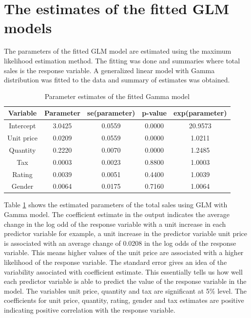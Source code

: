 \section{The estimates of the fitted GLM models}
The parameters of the fitted  GLM model are estimated using the maximum likelihood estimation method. The fitting was done and summaries where total sales is the response variable.
A generalized linear model with Gamma distribution was fitted to the data and summary of estimates was obtained. 
\begin{table}[H]
\centering
\caption{Parameter estimates of the fitted Gamma model}	
	\begin{tabular}{ccccc}
		\hline
		Variable   & Parameter & se(parameter) & p-value & exp(parameter) \\ \hline
		Intercept  & 3.0425 & 0.0559     & 0.0000  & 20.9573        \\
		Unit price & 0.0209 & 0.0559     & 0.0000  & 1.0211         \\
		Quantity   & 0.2220 & 0.0070     & 0.0000  & 1.2485         \\
		Tax        & 0.0003 & 0.0023     & 0.8800  & 1.0003         \\
		Rating     & 0.0039 & 0.0051     & 0.4400  & 1.0039         \\
		Gender     & 0.0064 & 0.0175     & 0.7160  & 1.0064         \\ \hline
	\end{tabular}
\label{table:gamma}
\end{table}
 Table \ref{table:gamma} shows the estimated parameters of the total sales using GLM with Gamma model. The coefficient estimate in the output indicates the average change in the log odd of the response variable with a unit increase in each predictor variable for example, a unit increase in the predictor variable unit price is associated with an average change of 0.0208 in the log odds of the response variable. This means higher values of the unit price are associated with a higher likelihood of the response variable. The standard error  gives an idea of the  variability associated with coefficient estimate. This essentially tells us how well each predictor variable is able to predict the value of the response variable in the model. The variables unit price, quantity and tax are significant at 5\% level. The coefficients for unit price, quantity, rating, gender and tax estimates are positive indicating positive correlation with the response variable.
  
